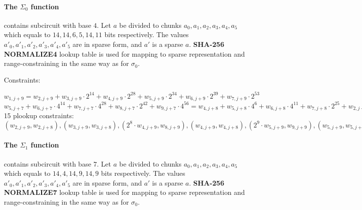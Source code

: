 \paragraph{The $\Sigma_0$ function}
contains subcircuit with base $4$.
Let $a$ be divided to chunks $a_0, a_1, a_2, a_3, a_4, a_5$ which equals to $14, 14, 6, 5, 14, 11$ bits respectively.
The values $a'_0, a'_1, a'_2, a'_3, a'_4, a'_5$ are in sparse form, and $a'$ is a sparse $a$.
\textbf{SHA-256 NORMALIZE4} lookup table is used for mapping to sparse representation and range-constraining in the same way as for $\sigma_0$.

Constraints:
\begin{center}
    $w_{1, j + 9} = w_{2, j + 9} + w_{3, j + 9} \cdot 2^{14} + w_{4, j + 9} \cdot 2^{28} + w_{5, j + 9} \cdot 2^{34} + w_{6, j + 9} \cdot 2^{39} + w_{7,  j + 9}\cdot 2^{53}$ \\
    $w_{5, j + 7} + w_{6, j + 7} \cdot 4^{14} + w_{7, j + 7} \cdot 4^{28} + w_{8, j + 7} \cdot 2^{42} + w_{9, j + 7} \cdot 4^{56} = w_{4, j + 8} + w_{5, j + 8} \cdot 4^6 + w_{6, j + 8} \cdot 4^{11} + w_{7, j + 8} \cdot 2^{25} + w_{2, j + 8} \cdot 4^{36} + w_{3, j + 8} \cdot 4^{50} + 
     w_{5, j + 8} + w_{6, j + 8} \cdot 4^{5} + w_{7, j + 8} \cdot 4^{19} + w_{2, j + 8} \cdot 2^{30} + w_{3, j + 8} \cdot 4^{44} + w_{4, j + 8} \cdot 4^{58} +
     w_{6, j + 8} + w_{7, j + 8} \cdot 4^{14} + w_{2, j + 8} \cdot 4^{25} + w_{3, j + 8} \cdot 2^{39} + w_{4, j + 8} \cdot 4^{53} + w_{5, j + 8} \cdot 4^{59}$ \\
    15 plookup constraints: $(w_{2, j + 9}, w_{2, j + 8}), (w_{3, j + 9}, w_{3, j + 8}), ( 2^{8} \cdot w_{4, j + 9}, w_{8, j + 9}), (w_{4, j + 9}, w_{4, j + 8}), (2^9 \cdot w_{5, j + 9}, w_{9, j + 9}), (w_{5, j + 9}, w_{5, j + 8}), (w_{6, j + 9}, w_{6, j + 8}), (2^3 \cdot w_{7, j + 9}, w_{8, j + 8}), (w_{7, j + 9}, w_{7, j + 8}), (w_{5, j + 6}, w_{5, j + 7}), (w_{6, j + 6}, w_{6, j + 7}), (w_{7, j + 6}, w_{7, j + 7}), (w_{8, j + 6}, w_{8, j + 7}), (w_{9, j + 6}, w_{9, j + 7}), (2^6 \cdot w_{9, j + 7}, w_{4, j + 7})$
\end{center}
\paragraph{The $\Sigma_1$ function}
contains subcircuit with base $7$.
Let $a$ be divided to chunks $a_0, a_1, a_2, a_3, a_4, a_5$ which equals to $14, 4, 14, 9, 14, 9$ bits respectively.
The values $a'_0, a'_1, a'_2, a'_3, a'_4, a'_5$ are in sparse form, and $a'$ is a sparse $a$.
\textbf{SHA-256 NORMALIZE7} lookup table is used for mapping to sparse representation and range-constraining in the same way as for $\sigma_0$.

